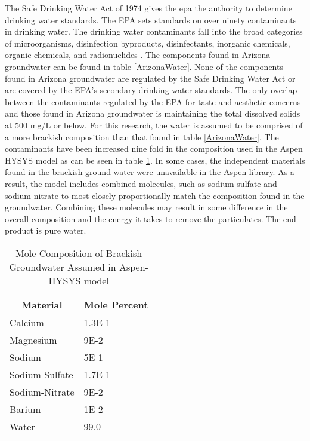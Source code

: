The Safe Drinking Water Act of 1974 gives the \ac{epa} the authority to determine drinking water standards. The EPA sets standards on over ninety contaminants in drinking water. The drinking water contaminants fall into the broad categories of microorganisms, disinfection byproducts, disinfectants, inorganic chemicals, organic chemicals, and radionuclides \cite{USEPA}. The components found in Arizona groundwater can be found in table \ref{ArizonaWater}.  None of the components found in Arizona groundwater are regulated by the Safe Drinking Water Act or are covered by the EPA's secondary drinking water standards\cite{USEPA}. The only overlap between the contaminants regulated by the EPA for taste and aesthetic concerns and those found in Arizona groundwater is maintaining the total dissolved solids at 500 mg/L or below. For this research, the water is assumed to be comprised of a more brackish composition than that found in table \ref{ArizonaWater}. The contaminants have been increased nine fold in the composition used in the Aspen HYSYS model as can be seen in table \ref{ModelComp}.  In some cases, the independent materials found in the brackish ground water were unavailable in the Aspen library.  As a result, the model includes combined molecules, such as sodium sulfate and sodium nitrate to most closely proportionally match the composition found in the groundwater.  Combining these molecules may result in some difference in the overall composition and the energy it takes to remove the particulates. The end product is pure water.

\begin{table}[h!]
\centering
\caption{Mole Composition of Brackish Groundwater Assumed in Aspen-HYSYS model}
\label{ModelComp}
\begin{tabular}{|l|l|}
\hline
\multicolumn{1}{|c|}{\textbf{Material}}                   & \multicolumn{1}{c|}{\textbf{Mole Percent}} \\ \hline
Calcium & 1.3E-1 \\ \hline
Magnesium  & 9E-2\\ \hline
Sodium  & 5E-1 \\ \hline
Sodium-Sulfate & 1.7E-1 \\ \hline
Sodium-Nitrate & 9E-2 \\ \hline
Barium & 1E-2 \\ \hline
Water & 99.0  \\ \hline
\end{tabular}
\end{table}

